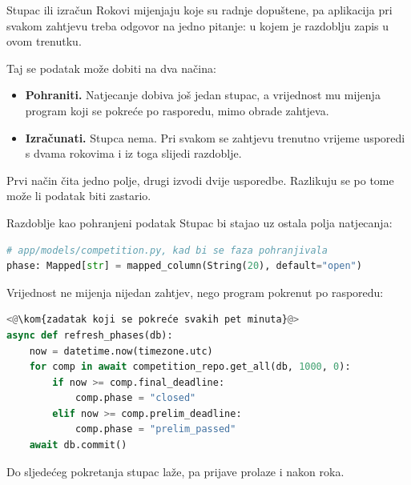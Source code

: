 
\begin{frame}{Stupac ili izračun}
Rokovi mijenjaju koje su radnje dopuštene, pa aplikacija pri svakom zahtjevu treba odgovor na jedno pitanje: u kojem je razdoblju zapis u ovom trenutku.

\vspace{0.7em}
Taj se podatak može dobiti na dva načina:

\vspace{0.3em}
\begin{itemize}
  \itemsep0.5em
  \item \textbf{Pohraniti.} Natjecanje dobiva još jedan stupac, a vrijednost mu mijenja program koji se pokreće po rasporedu, mimo obrade zahtjeva.
  \item \textbf{Izračunati.} Stupca nema. Pri svakom se zahtjevu trenutno vrijeme usporedi s dvama rokovima i iz toga slijedi razdoblje.
\end{itemize}

\vspace{0.7em}
Prvi način čita jedno polje, drugi izvodi dvije usporedbe. Razlikuju se po tome može li podatak biti zastario.
\end{frame}

\begin{frame}[fragile]{Razdoblje kao pohranjeni podatak}
Stupac bi stajao uz ostala polja natjecanja:

\begin{lstlisting}[language=python]
# app/models/competition.py, kad bi se faza pohranjivala
phase: Mapped[str] = mapped_column(String(20), default="open")
\end{lstlisting}

\vspace{0.25em}
Vrijednost ne mijenja nijedan zahtjev, nego program pokrenut po rasporedu:

\begin{lstlisting}[language=python]
<@\kom{zadatak koji se pokreće svakih pet minuta}@>
async def refresh_phases(db):
    now = datetime.now(timezone.utc)
    for comp in await competition_repo.get_all(db, 1000, 0):
        if now >= comp.final_deadline:
            comp.phase = "closed"
        elif now >= comp.prelim_deadline:
            comp.phase = "prelim_passed"
    await db.commit()
\end{lstlisting}

\vspace{0.25em}
Do sljedećeg pokretanja stupac laže, pa prijave prolaze i nakon roka.
\end{frame}

